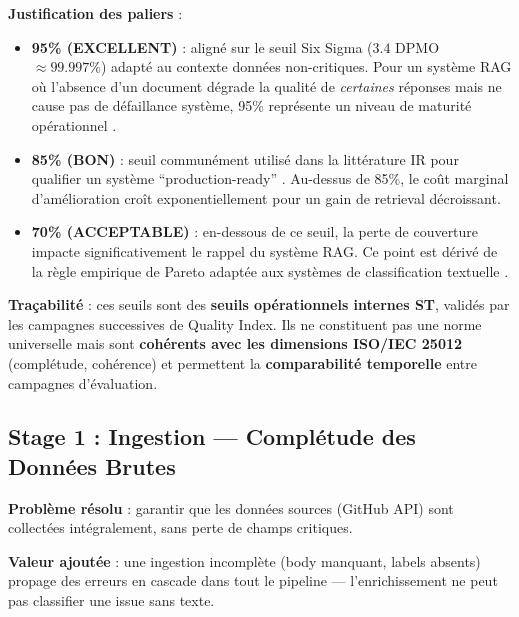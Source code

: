 \documentclass[12pt,a4paper]{report}
\begin{document}
\textbf{Justification des paliers} :
\begin{itemize}
  \item \textbf{95\% (EXCELLENT)} : aligné sur le seuil Six Sigma ($3.4$ DPMO $\approx 99.997\%$) adapté au contexte données non-critiques. Pour un système RAG où l'absence d'un document dégrade la qualité de \textit{certaines} réponses mais ne cause pas de défaillance système, 95\% représente un niveau de maturité opérationnel \cite{iso25024}.
  \item \textbf{85\% (BON)} : seuil communément utilisé dans la littérature IR pour qualifier un système ``production-ready'' \cite{manning2008ir}. Au-dessus de 85\%, le coût marginal d'amélioration croît exponentiellement pour un gain de retrieval décroissant.
  \item \textbf{70\% (ACCEPTABLE)} : en-dessous de ce seuil, la perte de couverture impacte significativement le rappel du système RAG. Ce point est dérivé de la règle empirique de Pareto adaptée aux systèmes de classification textuelle \cite{fawcett2006roc}.
\end{itemize}

\textbf{Traçabilité} : ces seuils sont des \textbf{seuils opérationnels internes ST}, validés par les campagnes successives de Quality Index. Ils ne constituent pas une norme universelle mais sont \textbf{cohérents avec les dimensions ISO/IEC 25012} (complétude, cohérence) et permettent la \textbf{comparabilité temporelle} entre campagnes d'évaluation.

\subsection{Stage 1 : Ingestion --- Complétude des Données Brutes}
\label{sec:eval_ingestion}

\textbf{Problème résolu} : garantir que les données sources (GitHub API) sont collectées intégralement, sans perte de champs critiques.

\textbf{Valeur ajoutée} : une ingestion incomplète (body manquant, labels absents) propage des erreurs en cascade dans tout le pipeline --- l'enrichissement ne peut pas classifier une issue sans texte.
\end{document}
